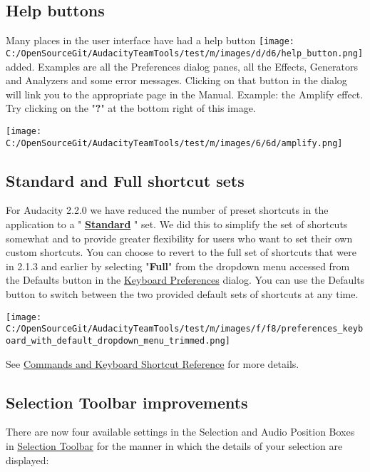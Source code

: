 \begin{multicols}{2}
\subsection{Help buttons}Many places in the user interface have had a help button \protect\texttt{[image: C:/OpenSourceGit/AudacityTeamTools/test/m/images/d/d6/help\_button.png]} added. Examples are all the Preferences dialog panes, all the Effects, Generators and Analyzers and some error messages.
Clicking on that button in the dialog will link you to the appropriate page in the Manual.
Example: the Amplify effect.  Try clicking on the "\textbf{?}" at the bottom right of this image.
\par \protect\texttt{[image: C:/OpenSourceGit/AudacityTeamTools/test/m/images/6/6d/amplify.png]}\par 
\label{newXfeaturesXinXthisXreleaseXshortcuts}
\subsection{Standard and Full shortcut sets}For Audacity 2.2.0 we have reduced the number of preset shortcuts in the application to a "\textbf{
\hyperref[\foo{keyboardXshortcutXreferenceX}]{Standard}
}" set.  We did this to simplify the set of shortcuts somewhat and to provide greater flexibility for users who want to set their own custom shortcuts.
You can choose to revert to the full set of shortcuts that were in 2.1.3 and earlier by selecting "\textbf{Full}" from the dropdown menu accessed from the Defaults button in the 
\hyperref[\foo{keyboardXpreferencesX}]{Keyboard Preferences}
 dialog.
You can use the Defaults button to switch between the two provided default sets of shortcuts at any time.
\par \protect\texttt{[image: C:/OpenSourceGit/AudacityTeamTools/test/m/images/f/f8/preferences\_keyboard\_with\_default\_dropdown\_menu\_trimmed.png]}\par See 
\hyperref[\foo{keyboardXshortcutXreferenceX}]{Commands and Keyboard Shortcut Reference}
 for more details.

\label{newXfeaturesXinXthisXreleaseXselection}
\subsection{Selection Toolbar improvements}There are now four available settings in the Selection and Audio Position Boxes in 
\hyperref[\foo{selectionXtoolbarX}]{Selection Toolbar}
 for the  manner in which the details of your selection are displayed:


\end{multicols}
